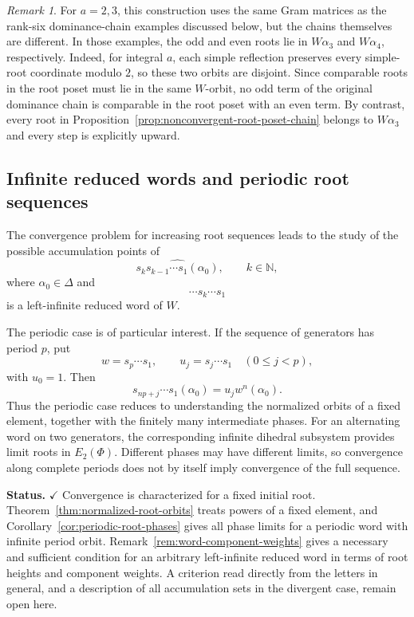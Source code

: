 \documentclass[11pt,reqno]{amsart}
\theoremstyle{plain}
\theoremstyle{definition}
\theoremstyle{remark}
\newtheorem{remark}[theorem]{Remark}
\numberwithin{equation}{section}
\begin{document}
\begin{remark}
For $a=2,3$, this construction uses the same Gram matrices as
the rank-six dominance-chain examples discussed below, but the
chains themselves are different. In those examples, the odd
and even roots lie in $W\alpha_3$ and $W\alpha_4$, respectively.
Indeed, for integral $a$, each simple reflection preserves every
simple-root coordinate modulo $2$, so these two orbits are
disjoint. Since comparable roots in the root poset must lie
in the same $W$-orbit, no odd term of the original dominance
chain is comparable in the root poset with an even term.
By contrast, every root in
Proposition~\ref{prop:nonconvergent-root-poset-chain}
belongs to $W\alpha_3$ and every step is explicitly upward.
\end{remark}
\subsection{Infinite reduced words and periodic root sequences}

The convergence problem for increasing root sequences leads to
the study of the possible accumulation points of
\[
\widehat{s_k s_{k-1}\cdots s_1(\alpha_0)},
\qquad k\in\mathbb N,
\]
where $\alpha_0\in\Delta$ and
\[
\cdots s_k\cdots s_1
\]
is a left-infinite reduced word of $W$.

The periodic case is of particular interest.
If the sequence of generators has period $p$, put
\[
w=s_p\cdots s_1,
\qquad
u_j=s_j\cdots s_1
\quad(0\le j<p),
\]
with $u_0=1$.
Then
\[
s_{np+j}\cdots s_1(\alpha_0)
=
u_jw^n(\alpha_0).
\]
Thus the periodic case reduces to understanding the normalized
orbits of a fixed element, together with the finitely many
intermediate phases.
For an alternating word on two generators, the corresponding
infinite dihedral subsystem provides limit roots in $E_2(\Phi)$.
Different phases may have different limits, so convergence
along complete periods does not by itself imply convergence
of the full sequence.

\par\medskip
\noindent\textbf{Status.}
$\checkmark$ Convergence is characterized for a fixed initial root.
Theorem~\ref{thm:normalized-root-orbits} treats powers of a fixed
element, and Corollary~\ref{cor:periodic-root-phases} gives all phase
limits for a periodic word with infinite period orbit.
Remark~\ref{rem:word-component-weights} gives a necessary and sufficient
condition for an arbitrary left-infinite reduced word in terms of root
heights and component weights. A criterion read directly from the
letters in general, and a description of all accumulation sets in the
divergent case, remain open here.
\end{document}
